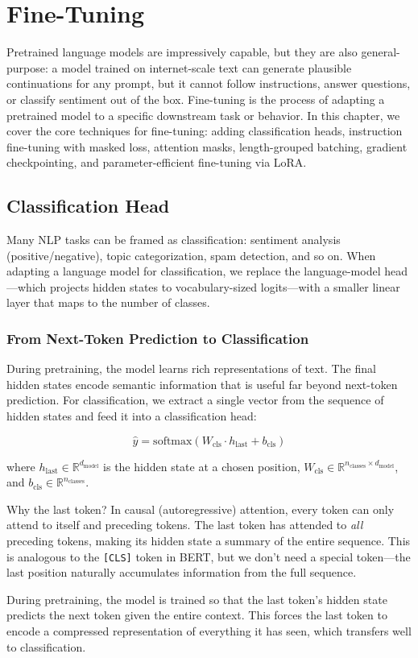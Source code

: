 \chapter{Fine-Tuning}

Pretrained language models are impressively capable, but they are also
general-purpose: a model trained on internet-scale text can generate
plausible continuations for any prompt, but it cannot follow
instructions, answer questions, or classify sentiment out of the box.
Fine-tuning is the process of adapting a pretrained model to a specific
downstream task or behavior. In this chapter, we cover the core
techniques for fine-tuning: adding classification heads, instruction
fine-tuning with masked loss, attention masks, length-grouped batching,
gradient checkpointing, and parameter-efficient fine-tuning via LoRA.

\section{Classification Head}

Many NLP tasks can be framed as classification: sentiment analysis
(positive/negative), topic categorization, spam detection, and so on.
When adapting a language model for classification, we replace the
language-model head---which projects hidden states to vocabulary-sized
logits---with a smaller linear layer that maps to the number of
classes.

\subsection{From Next-Token Prediction to Classification}

During pretraining, the model learns rich representations of text. The
final hidden states encode semantic information that is useful far
beyond next-token prediction. For classification, we extract a single
vector from the sequence of hidden states and feed it into a
classification head:

\[
  \hat{y} = \text{softmax}\!\left(W_{\text{cls}} \cdot h_{\text{last}} + b_{\text{cls}}\right)
\]

where $h_{\text{last}} \in \mathbb{R}^{d_{\text{model}}}$ is the hidden
state at a chosen position, $W_{\text{cls}} \in \mathbb{R}^{n_{\text{classes}} \times d_{\text{model}}}$,
and $b_{\text{cls}} \in \mathbb{R}^{n_{\text{classes}}}$.

\begin{keyconcept}
  Why the last token? In causal (autoregressive) attention, every token
  can only attend to itself and preceding tokens. The last token has
  attended to \emph{all} preceding tokens, making its hidden state a
  summary of the entire sequence. This is analogous to the
  \texttt{[CLS]} token in BERT, but we don't need a special
  token---the last position naturally accumulates information from the
  full sequence.

  During pretraining, the model is trained so that the last token's
  hidden state predicts the next token given the entire context. This
  forces the last token to encode a compressed representation of
  everything it has seen, which transfers well to classification.
\end{keyconcept}

